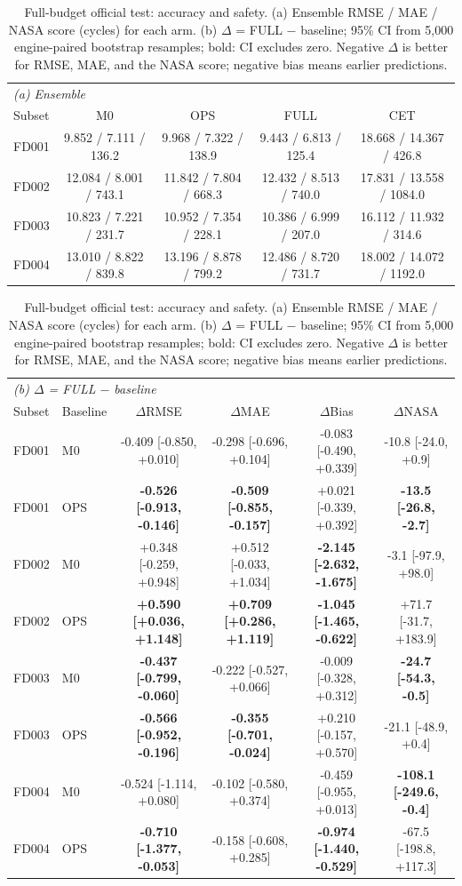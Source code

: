 \begin{table}[t]
\centering
\caption{Full-budget official test: accuracy and safety. (a) Ensemble RMSE / MAE / NASA score (cycles) for each arm. (b) $\Delta$ = FULL $-$ baseline; 95\% CI from 5,000 engine-paired bootstrap resamples; bold: CI excludes zero. Negative $\Delta$ is better for RMSE, MAE, and the NASA score; negative bias means earlier predictions.}
\label{tab:metrics-full}
\small
\begin{tabular}{lcccc}
\toprule
\multicolumn{5}{l}{\textit{(a) Ensemble}} \\
Subset & M0 & OPS & FULL & CET \\
\midrule
FD001 & 9.852 / 7.111 / 136.2 & 9.968 / 7.322 / 138.9 & 9.443 / 6.813 / 125.4 & 18.668 / 14.367 / 426.8 \\
FD002 & 12.084 / 8.001 / 743.1 & 11.842 / 7.804 / 668.3 & 12.432 / 8.513 / 740.0 & 17.831 / 13.558 / 1084.0 \\
FD003 & 10.823 / 7.221 / 231.7 & 10.952 / 7.354 / 228.1 & 10.386 / 6.999 / 207.0 & 16.112 / 11.932 / 314.6 \\
FD004 & 13.010 / 8.822 / 839.8 & 13.196 / 8.878 / 799.2 & 12.486 / 8.720 / 731.7 & 18.002 / 14.072 / 1192.0 \\
\bottomrule
\end{tabular}

\vspace{4pt}
\begin{tabular}{llcccc}
\toprule
\multicolumn{6}{l}{\textit{(b) $\Delta$ = FULL $-$ baseline}} \\
Subset & Baseline & $\Delta$RMSE & $\Delta$MAE & $\Delta$Bias & $\Delta$NASA \\
\midrule
FD001 & M0 & -0.409 [-0.850, +0.010] & -0.298 [-0.696, +0.104] & -0.083 [-0.490, +0.339] & -10.8 [-24.0, +0.9] \\
FD001 & OPS & \textbf{-0.526 [-0.913, -0.146]} & \textbf{-0.509 [-0.855, -0.157]} & +0.021 [-0.339, +0.392] & \textbf{-13.5 [-26.8, -2.7]} \\
FD002 & M0 & +0.348 [-0.259, +0.948] & +0.512 [-0.033, +1.034] & \textbf{-2.145 [-2.632, -1.675]} & -3.1 [-97.9, +98.0] \\
FD002 & OPS & \textbf{+0.590 [+0.036, +1.148]} & \textbf{+0.709 [+0.286, +1.119]} & \textbf{-1.045 [-1.465, -0.622]} & +71.7 [-31.7, +183.9] \\
FD003 & M0 & \textbf{-0.437 [-0.799, -0.060]} & -0.222 [-0.527, +0.066] & -0.009 [-0.328, +0.312] & \textbf{-24.7 [-54.3, -0.5]} \\
FD003 & OPS & \textbf{-0.566 [-0.952, -0.196]} & \textbf{-0.355 [-0.701, -0.024]} & +0.210 [-0.157, +0.570] & -21.1 [-48.9, +0.4] \\
FD004 & M0 & -0.524 [-1.114, +0.080] & -0.102 [-0.580, +0.374] & -0.459 [-0.955, +0.013] & \textbf{-108.1 [-249.6, -0.4]} \\
FD004 & OPS & \textbf{-0.710 [-1.377, -0.053]} & -0.158 [-0.608, +0.285] & \textbf{-0.974 [-1.440, -0.529]} & -67.5 [-198.8, +117.3] \\
\bottomrule
\end{tabular}
\end{table}

